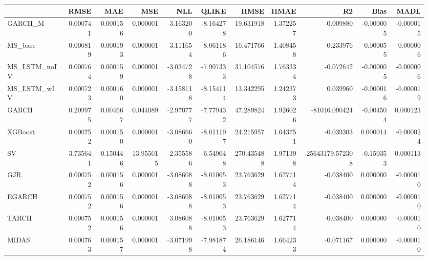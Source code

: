 \begin{tabular}{lrrrrrrrrrr}
\toprule
 & RMSE & MAE & MSE & NLL & QLIKE & HMSE & HMAE & R2 & Bias & MADL \\
\midrule
GARCH_M & 0.000741 & 0.000156 & 0.000001 & -3.163200 & -8.164278 & 19.631918 & 1.372257 & -0.009880 & -0.000005 & -0.000015 \\
MS_base & 0.000819 & 0.000193 & 0.000001 & -3.111654 & -8.061186 & 16.471766 & 1.408458 & -0.233976 & -0.000055 & -0.000006 \\
MS_LSTM_noIV & 0.000764 & 0.000159 & 0.000001 & -3.034728 & -7.907333 & 31.104576 & 1.763334 & -0.072642 & -0.000005 & -0.000006 \\
MS_LSTM_wIV & 0.000723 & 0.000160 & 0.000001 & -3.158118 & -8.154114 & 13.342295 & 1.242373 & 0.039960 & -0.000016 & -0.000019 \\
GARCH & 0.209975 & 0.004667 & 0.044089 & -2.970777 & -7.779432 & 47.289824 & 1.926026 & -81016.090424 & -0.004504 & 0.000123 \\
XGBoost & 0.000752 & 0.000150 & 0.000001 & -3.086660 & -8.011197 & 24.215957 & 1.643751 & -0.039303 & 0.000014 & -0.000024 \\
SV & 3.735641 & 0.150446 & 13.955015 & -2.355586 & -6.549048 & 270.435488 & 1.971398 & -25643179.572308 & -0.150353 & 0.000113 \\
GJR & 0.000752 & 0.000156 & 0.000001 & -3.086088 & -8.010053 & 23.763629 & 1.627714 & -0.038400 & 0.000000 & -0.000010 \\
EGARCH & 0.000752 & 0.000156 & 0.000001 & -3.086088 & -8.010053 & 23.763629 & 1.627714 & -0.038400 & 0.000000 & -0.000010 \\
TARCH & 0.000752 & 0.000156 & 0.000001 & -3.086088 & -8.010053 & 23.763629 & 1.627714 & -0.038400 & 0.000000 & -0.000010 \\
MIDAS & 0.000763 & 0.000157 & 0.000001 & -3.071998 & -7.981874 & 26.186146 & 1.664233 & -0.071167 & 0.000000 & -0.000010 \\
\bottomrule
\end{tabular}

